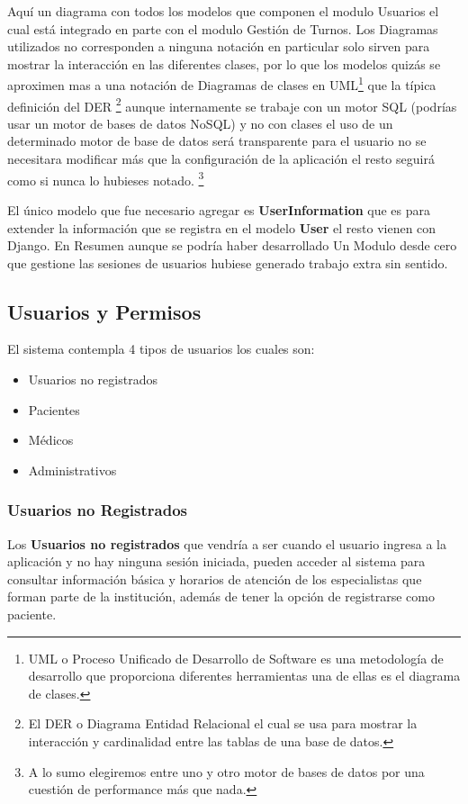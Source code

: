 Aquí un diagrama con todos los modelos que componen el modulo Usuarios el cual está integrado en parte con el modulo Gestión de Turnos. Los Diagramas utilizados no corresponden a ninguna notación en particular solo sirven para mostrar la interacción en las diferentes clases, por lo que los modelos quizás se aproximen mas a una notación de Diagramas de clases en UML\footnote{UML o Proceso Unificado de Desarrollo de Software es una metodología de desarrollo que proporciona diferentes herramientas una de ellas es el diagrama de clases.} que la típica definición del DER \footnote{El DER o Diagrama Entidad Relacional el cual se usa para mostrar la interacción y cardinalidad entre las tablas de una base de datos.} aunque internamente se trabaje con un motor SQL (podrías usar un motor de bases de datos NoSQL)  y no con clases el uso de un determinado motor de base de datos será transparente para el usuario no se necesitara modificar más que la configuración de la aplicación el resto seguirá como si nunca lo hubieses notado. \footnote{A lo sumo elegiremos entre uno y otro motor de bases de datos por una cuestión de performance más que nada.}

El único modelo que fue necesario agregar es \textbf{UserInformation} que es para extender la información que se registra en el modelo \textbf{User} el resto vienen con Django. En Resumen aunque se podría haber desarrollado Un Modulo desde cero que gestione las sesiones de usuarios hubiese generado trabajo extra sin sentido.

\subsection{Usuarios y Permisos}

El sistema contempla 4 tipos de usuarios los cuales son: 

\begin{itemize}
    \item Usuarios no registrados 
    \item Pacientes
    \item Médicos
    \item Administrativos
\end{itemize}

\subsubsection{Usuarios no Registrados}

Los \textbf{Usuarios no registrados} que vendría a ser cuando el usuario ingresa a la aplicación y no hay ninguna sesión iniciada, pueden acceder al sistema para consultar información básica y horarios de atención de los especialistas que forman parte de la institución, además de tener la opción de registrarse como paciente.\\[0.1cm]    

